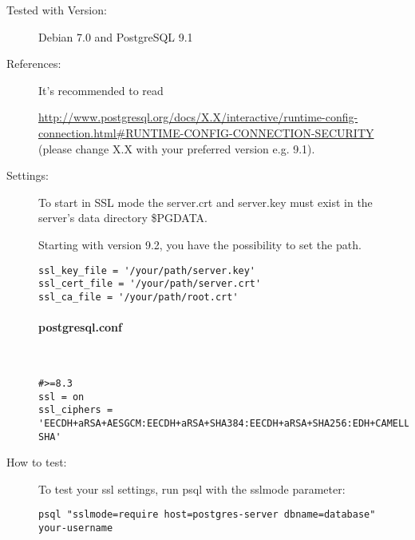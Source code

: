 \begin{description}
\item[Tested with Version:] Debian 7.0 and PostgreSQL 9.1

\item[References:]

It's recommended to read 

{\small \url{http://www.postgresql.org/docs/X.X/interactive/runtime-config-connection.html\#RUNTIME-CONFIG-CONNECTION-SECURITY}}
(please change X.X with your preferred version e.g. 9.1).

\item[Settings:] \mbox{}


To start in SSL mode the server.crt and server.key must exist in the server's data directory \$PGDATA. 

Starting with version 9.2, you have the possibility to set the path.

\begin{lstlisting}[breaklines]
ssl_key_file = '/your/path/server.key'
ssl_cert_file = '/your/path/server.crt'
ssl_ca_file = '/your/path/root.crt'
\end{lstlisting}

\paragraph*{postgresql.conf}\mbox{}\\

\begin{lstlisting}[breaklines]
#>=8.3
ssl = on 
ssl_ciphers = 'EECDH+aRSA+AESGCM:EECDH+aRSA+SHA384:EECDH+aRSA+SHA256:EDH+CAMELLIA256:EECDH:EDH+aRSA:+SSLv3:!aNULL:!eNULL:!LOW:!3DES:!MD5:!EXP:!PSK:!SRP:!DSS:!RC4:!SEED:!AES128:!CAMELLIA128:!ECDSA:AES256-SHA'
\end{lstlisting}



\item[How to test:]
To test your ssl settings, run psql with the sslmode parameter:
\begin{lstlisting}[breaklines]
psql "sslmode=require host=postgres-server dbname=database" your-username
\end{lstlisting}

\end{description}

